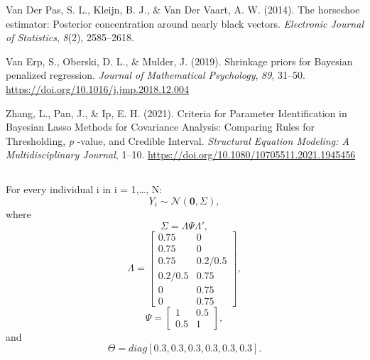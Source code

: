 \documentclass[
  man, donotrepeattitle,floatsintext]{apa6}
\newlength{\cslhangindent}
\newlength{\cslentryspacingunit} %
\newenvironment{CSLReferences}[2] %
 {%
  \setlength{\parindent}{0pt}
  \ifodd #1
  \let\oldpar\par
  \def\par{\hangindent=\cslhangindent\oldpar}
  \fi
  \setlength{\parskip}{#2\cslentryspacingunit}
 }%
 {}
\begin{document}
\begin{CSLReferences}{1}{0}
\leavevmode{}%
Van Der Pas, S. L., Kleijn, B. J., \& Van Der Vaart, A. W. (2014). The horseshoe estimator: {Posterior} concentration around nearly black vectors. \emph{Electronic Journal of Statistics}, \emph{8}(2), 2585--2618.

\leavevmode{}%
Van Erp, S., Oberski, D. L., \& Mulder, J. (2019). Shrinkage priors for {Bayesian} penalized regression. \emph{Journal of Mathematical Psychology}, \emph{89}, 31--50. \url{https://doi.org/10.1016/j.jmp.2018.12.004}

\leavevmode{}%
Zhang, L., Pan, J., \& Ip, E. H. (2021). Criteria for {Parameter} {Identification} in {Bayesian} {Lasso} {Methods} for {Covariance} {Analysis}: {Comparing} {Rules} for {Thresholding}, \emph{p} -value, and {Credible} {Interval}. \emph{Structural Equation Modeling: A Multidisciplinary Journal}, 1--10. \url{https://doi.org/10.1080/10705511.2021.1945456}

\end{CSLReferences}

\endgroup


\clearpage
\makeatletter
\efloat@restorefloats
\makeatother


\begin{appendix}
\section{}
For every individual i in i = 1,\ldots, N:
\[Y_i \sim \mathcal{N}(\mathbf{0}, \Sigma),\] where
\[\Sigma = \Lambda\Psi\Lambda',\] \[\Lambda = 
    \begin{bmatrix}
    0.75 & 0 \\
    0.75 & 0 \\
    0.75 & 0.2/0.5 \\
    0.2/0.5 & 0.75 \\
    0 & 0.75 \\
    0 & 0.75
    \end{bmatrix},\] \[\Psi =
    \begin{bmatrix}
     1 & 0.5 \\
     0.5 & 1
    \end{bmatrix}
,\] and \[\Theta = diag[0.3, 0.3, 0.3, 0.3, 0.3, 0.3].\]
\end{appendix}

\clearpage
\makeatletter
\efloat@restorefloats
\makeatother
\end{document}
